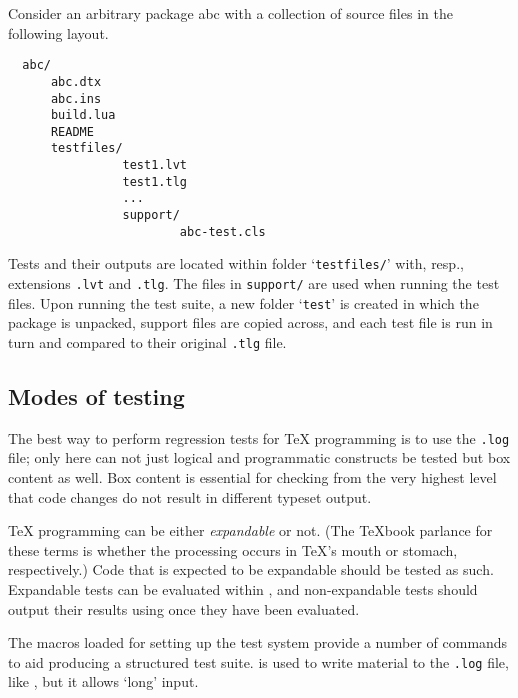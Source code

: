 \documentclass[a4paper]{ltugboat}
\begin{document}
Consider an arbitrary package \textsf{abc} with a collection of source files in the following layout.
\begin{Verbatim}
  abc/
      abc.dtx
      abc.ins
      build.lua
      README
      testfiles/
                test1.lvt
                test1.tlg
                ...
                support/
                        abc-test.cls
\end{Verbatim}
Tests and their outputs are located within folder `\texttt{testfiles/}' with, resp., extensions \texttt{.lvt} and \texttt{.tlg}.
The files in \texttt{support/} are used when running the test files.
Upon running the test suite, a new folder `\texttt{test}' is created in which the package is unpacked, support files are copied across, and each test file is run in turn and compared to their original \texttt{.tlg} file.

\subsection{Modes of testing}

The best way to perform regression tests for \TeX{} programming is to use the \texttt{.log} file; only here can not just logical and programmatic constructs be tested but box content as well.
Box content is essential for checking from the very highest level that code changes do not result in different typeset output.

\TeX{} programming can be either \emph{expandable} or not.
(The \TeX book parlance for these terms is whether the processing occurs in \TeX's mouth or stomach, respectively.)
Code that is expected to be expandable should be tested as such.
Expandable tests can be evaluated within , and non-expandable tests should output their results using  once they have been evaluated.

The macros loaded for setting up the test system provide a number of commands to aid producing a structured test suite.  is used to write material to the \texttt{.log} file, like , but it allows `long' input.
\end{document}
